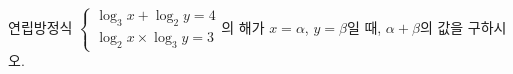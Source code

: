 연립방정식 $\begin{cases} \log_3 x+\log_2 y=4 \\ \log_2 x\times\log_3 y=3 \end{cases}$의 해가 $x=\alpha$, $y=\beta$일 때, $\alpha+\beta$의 값을 구하시오. 
